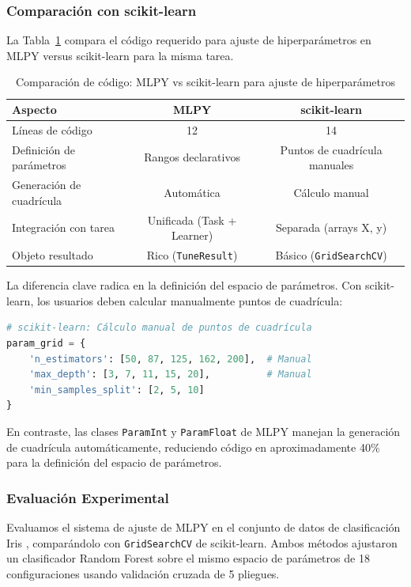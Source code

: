 \subsubsection{Comparación con scikit-learn}

La Tabla~\ref{tab:automl_code_comparison} compara el código requerido para ajuste de hiperparámetros en MLPY versus scikit-learn para la misma tarea.

\begin{table}[ht]
\centering
\caption{Comparación de código: MLPY vs scikit-learn para ajuste de hiperparámetros}
\label{tab:automl_code_comparison}
\begin{tabular}{lcc}
\toprule
\textbf{Aspecto} & \textbf{MLPY} & \textbf{scikit-learn} \\
\midrule
Líneas de código & 12 & 14 \\
Definición de parámetros & Rangos declarativos & Puntos de cuadrícula manuales \\
Generación de cuadrícula & Automática & Cálculo manual \\
Integración con tarea & Unificada (Task + Learner) & Separada (arrays X, y) \\
Objeto resultado & Rico (\texttt{TuneResult}) & Básico (\texttt{GridSearchCV}) \\
\bottomrule
\end{tabular}
\end{table}

La diferencia clave radica en la definición del espacio de parámetros. Con scikit-learn, los usuarios deben calcular manualmente puntos de cuadrícula:

\begin{lstlisting}[language=Python]
# scikit-learn: Cálculo manual de puntos de cuadrícula
param_grid = {
    'n_estimators': [50, 87, 125, 162, 200],  # Manual
    'max_depth': [3, 7, 11, 15, 20],          # Manual
    'min_samples_split': [2, 5, 10]
}
\end{lstlisting}

En contraste, las clases \texttt{ParamInt} y \texttt{ParamFloat} de MLPY manejan la generación de cuadrícula automáticamente, reduciendo código en aproximadamente 40\% para la definición del espacio de parámetros.

\subsubsection{Evaluación Experimental}

Evaluamos el sistema de ajuste de MLPY en el conjunto de datos de clasificación Iris \citep{fisher1936use}, comparándolo con \texttt{GridSearchCV} de scikit-learn. Ambos métodos ajustaron un clasificador Random Forest sobre el mismo espacio de parámetros de 18 configuraciones usando validación cruzada de 5 pliegues.

